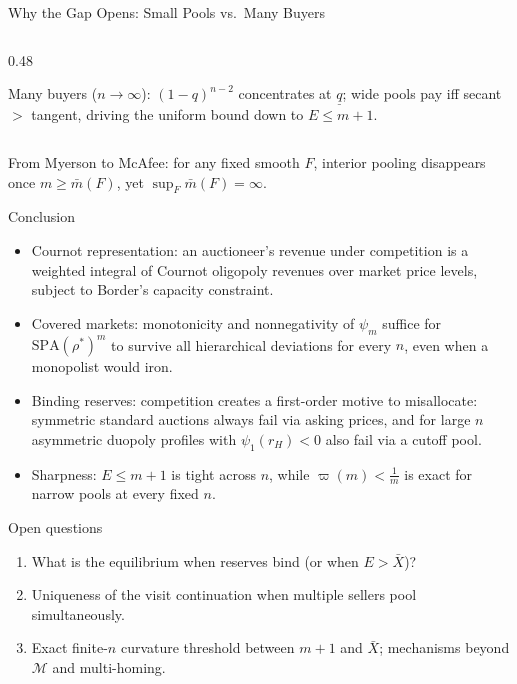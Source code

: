 \documentclass[11pt,aspectratio=169]{beamer}
\def\meditem{\smallskip\item}
\newcommand{\SPA}{\mathrm{SPA}}
\newcommand{\uq}{\underline q}
\begin{document}
\begin{frame}{Why the Gap Opens: Small Pools vs.\ Many Buyers}
\begin{columns}[T]
\begin{column}{0.48\textwidth}
\raggedright\footnotesize
\alert{Many buyers ($n\to\infty$)}: $(1-q)^{n-2}$ concentrates at $\uq$; wide pools pay iff secant $>$ tangent, driving the uniform bound down to $E\le m+1$.
\end{column}
\end{columns}

\medskip{}
\alert{From Myerson to McAfee}: for any fixed smooth $F$, interior pooling disappears once $m\ge\bar m(F)$, yet $\sup_F\bar m(F)=\infty$.
\end{frame}

\begin{frame}{Conclusion}
\begin{itemize}
\item \alert{Cournot representation}: an auctioneer's revenue under competition is a weighted integral of Cournot oligopoly revenues over market price levels, subject to Border's capacity constraint.
\meditem \alert{Covered markets}: monotonicity and nonnegativity of $\psi_m$ suffice for $\SPA(\rho^*)^m$ to survive all hierarchical deviations for every $n$, even when a monopolist would iron.
\meditem \alert{Binding reserves}: competition creates a first-order motive to misallocate: symmetric standard auctions always fail via asking prices, and for large $n$ asymmetric duopoly profiles with $\psi_1(r_H)<0$ also fail via a cutoff pool.
\meditem \alert{Sharpness}: $E\le m+1$ is tight across $n$, while $\varpi(m)<\frac1m$ is exact for narrow pools at every fixed $n$.
\end{itemize}

\begin{block}{Open questions}
\begin{enumerate}
\item What is the equilibrium when reserves bind (or when $E>\bar X$)?
\item Uniqueness of the visit continuation when multiple sellers pool simultaneously.
\item Exact finite-$n$ curvature threshold between $m+1$ and $\bar X$; mechanisms beyond $\mathcal M$ and multi-homing.
\end{enumerate}
\end{block}
\end{frame}

\appendix
\end{document}
